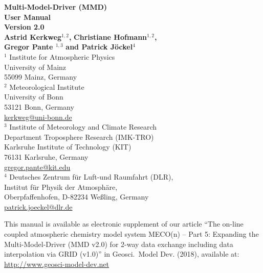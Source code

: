 \documentclass[11pt,twoside]{article}
\begin{document}
\thispagestyle{empty}
\begin{center}
  {\Huge\bf Multi-Model-Driver (MMD)\\ User Manual}\\[0.3cm]{\bf \large Version 2.0}\\[12mm]
\vspace*{1.5cm}
  {\LARGE\bf Astrid Kerkweg$^{1,2}$, }%
  {\LARGE\bf Christiane Hofmann$^{1,2}$, }\\[3mm]
  {\LARGE\bf Gregor Pante $^{1,3}$  }%
  {\LARGE\bf and Patrick J\"ockel$^4$}\\[9mm]
  \large
\vspace*{1.5cm}
  $^1$ Institute for Atmospheric Physics\\
  University of Mainz\\
  55099 Mainz, Germany \\[0.4cm]

  $^2$  Meteorological Institute\\
  University of Bonn \\
  53121 Bonn, Germany\\
  \url{kerkweg@uni-bonn.de} \\[0.4cm]

  $^3$ Institute of Meteorology and Climate Research\\
Department Troposphere Research (IMK-TRO)\\
Karlsruhe Institute of Technology (KIT)\\
76131 Karlsruhe, Germany \\
  \url{gregor.pante@kit.edu} \\[0.4cm]

  $^4$ Deutsches Zentrum f\"ur Luft-und Raumfahrt (DLR),\\
   Institut f\"ur Physik der Atmosph\"are, \\
    Oberpfaffenhofen, D-82234 We\ss ling, Germany \\
  \url{patrick.joeckel@dlr.de}


\end{center}

\vfill
{\large This manual is available as electronic supplement of our article
  ``The on-line coupled atmospheric chemistry model system MECO(n)
  – Part 5: Expanding the Multi-Model-Driver (MMD v2.0) for 2-way data
  exchange including data interpolation via GRID (v1.0)'' 
  in Geosci.\ Model Dev.
  (2018), available at: \url{http://www.geosci-model-dev.net}}
\end{document}
